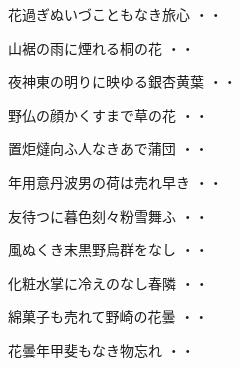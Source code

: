 \vspace{0.6cm}
\begin{shiika}花過ぎぬいづこともなき旅心
\hfill{・・}\end{shiika}
\vspace{0.6cm}
\begin{shiika}山裾の雨に煙れる桐の花
\hfill{・・}\end{shiika}
\vspace{0.6cm}
\begin{shiika}夜神東の明りに映ゆる銀杏黄葉
\hfill{・・}\end{shiika}
\vspace{0.6cm}
\begin{shiika}野仏の顔かくすまで草の花
\hfill{・・}\end{shiika}
\vspace{0.6cm}
\begin{shiika}置炬燵向ふ人なきあで蒲団
\hfill{・・}\end{shiika}
\vspace{0.6cm}
\begin{shiika}年用意丹波男の荷は売れ早き
\hfill{・・}\end{shiika}
\vspace{0.6cm}
\begin{shiika}友待つに暮色刻々粉雪舞ふ
\hfill{・・}\end{shiika}
\vspace{0.6cm}
\begin{shiika}風ぬくき末黒野烏群をなし
\hfill{・・}\end{shiika}
\vspace{0.6cm}
\begin{shiika}化粧水掌に冷えのなし春隣
\hfill{・・}\end{shiika}
\vspace{0.6cm}
\begin{shiika}綿菓子も売れて野崎の花曇
\hfill{・・}\end{shiika}
\vspace{0.6cm}
\begin{shiika}花曇年甲斐もなき物忘れ
\hfill{・・}\end{shiika}
